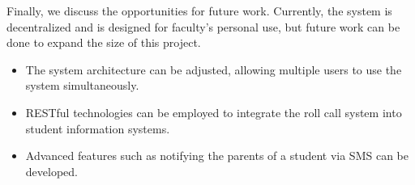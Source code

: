 Finally, we discuss the opportunities for future work. Currently, the system is decentralized and
is designed for faculty's personal use, but future work can be done to expand the size of this project.

\begin{itemize}
  \item The system architecture can be adjusted, allowing multiple users to use the system simultaneously.
  \item RESTful technologies can be employed to integrate the roll call system into student information systems.
  \item Advanced features such as notifying the parents of a student via SMS can be developed.
\end{itemize}
